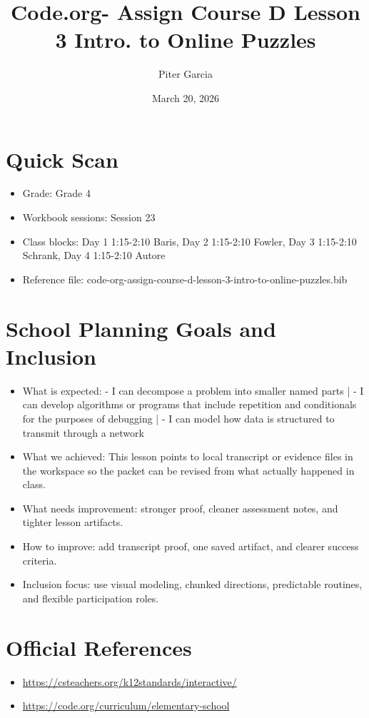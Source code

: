 \documentclass[11pt]{article}
\title{Code.org- Assign Course D Lesson 3 Intro. to Online Puzzles}
\author{Piter Garcia}
\date{March 20, 2026}
\begin{document}
    \maketitle
    \section*{Quick Scan}
    \begin{itemize}[leftmargin=*]
    \item Grade: Grade 4
    \item Workbook sessions: Session 23
    \item Class blocks: Day 1 1:15-2:10 Baris, Day 2 1:15-2:10 Fowler, Day 3 1:15-2:10 Schrank, Day 4 1:15-2:10 Autore
    \item Reference file: code-org-assign-course-d-lesson-3-intro-to-online-puzzles.bib
    \end{itemize}
    \section*{School Planning Goals and Inclusion}
    \begin{itemize}[leftmargin=*]
    \item What is expected: - I can decompose a problem into smaller named parts | - I can develop algorithms or programs that include repetition and conditionals for the purposes of debugging | - I can model how data is structured to transmit through a network
    \item What we achieved: This lesson points to local transcript or evidence files in the workspace so the packet can be revised from what actually happened in class.
    \item What needs improvement: stronger proof, cleaner assessment notes, and tighter lesson artifacts.
    \item How to improve: add transcript proof, one saved artifact, and clearer success criteria.
    \item Inclusion focus: use visual modeling, chunked directions, predictable routines, and flexible participation roles.
    \end{itemize}
    \section*{Official References}
    \begin{itemize}[leftmargin=*]
    \item \url{https://csteachers.org/k12standards/interactive/}
\item \url{https://code.org/curriculum/elementary-school}

    \end{itemize}
    
\end{document}
